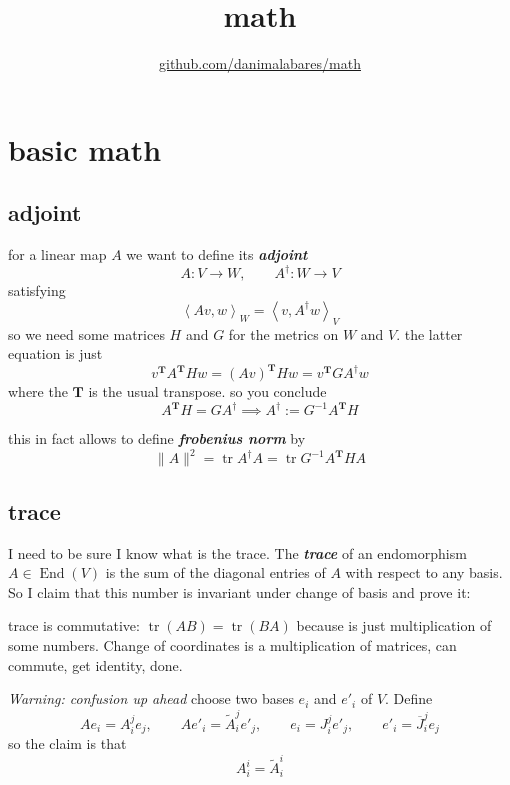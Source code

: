 
\usepackage{textgreek}
\title{math}
\author{\href{https://github.com/danimalabares/math}{github.com/danimalabares/math}}




\maketitle
{}
\tableofcontents
\clearpage
\chapter{basic math}

\section{adjoint}

for a linear map \(A\) we want to define its \textit{\textbf{adjoint}}
\[A:V \to W, \qquad A^{\dag}:W \to V\]
satisfying
\[\left<Av,w\right>_W=\left<v,A^\dag w\right>_V\]
so we need some matrices \(H\) and \(G\) for the metrics on \(W\) and \(V\). the latter equation is just
\[v^{\mathbf{T}}A^{\mathbf{T}}Hw=(Av)^{\mathbf{T}}Hw=v^{\mathbf{T}}GA^\dag w\]
where the \(\mathbf{T}\) is the usual transpose. so you conclude
\[A^{\mathbf{T}}H=GA^\dag \implies A^\dag:=G^{-1}A^{\mathbf{T}}H\]

this in fact allows to define \textit{\textbf{frobenius norm}} by
\[\|A\|^2=\operatorname{tr}A^\dag A=\operatorname{tr}G^{-1}A^{\mathbf{T}}HA\]


\section{trace}

I need to be sure I know what is the trace. The \textit{\textbf{trace}} of an endomorphism \(A \in \operatorname{End}(V)\) is the sum of the diagonal entries of \(A\) with respect to any basis. So I claim that this number is invariant under change of basis and prove it:

trace is commutative: \(\operatorname{tr}(AB)=\operatorname{tr}(BA)\) because is just multiplication of some numbers. Change of coordinates is a multiplication of matrices, can commute, get identity, done.

\textit{Warning: confusion up ahead} choose two bases \(e_i\) and \(e'_i\) of \(V\). Define
\[Ae_i=A^j_ie_j,\qquad Ae'_i=\tilde{A}^j_ie'_j,\qquad e_i=J^j_ie'_j, \qquad e'_i=\overline{J}^j_ie_j\]
so the claim is that
\[A^i_i=\tilde{A}^i_i\]

